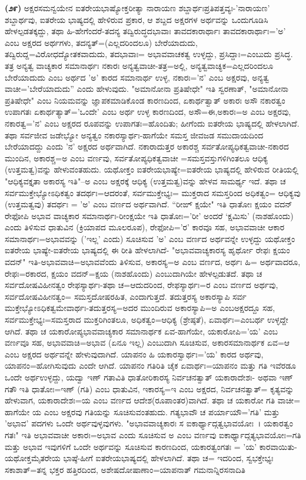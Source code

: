 \textbf{(೨೯)} ಅಕ್ಷರಸಮನ್ವಯೇನ ಐತರೇಯಭಾಷ್ಯೋಕ್ತರೀತ್ಯಾ ನಾರಾಯಣ ಶಬ್ದಾರ್ಥಃ\break ಪ್ರತಿಪತ್ತವ್ಯಃ-'ನಾರಾಯಣ' ಶಬ್ದಾರ್ಥವು, ಐತರೇಯ ಭಾಷ್ಯದಲ್ಲಿ ಹೇಳಿರುವ ಪ್ರಕಾರ, ಆ ಶಬ್ದದ ಅಕ್ಷರಗಳ ಅರ್ಥವನ್ನು ಒಂದುಗೂಡಿಸಿ ಹೇಳಲ್ಪಡತಕ್ಕದ್ದು, ತಥಾ ಹಿ-ಹೇಗೆಂದರೆ-\-ತದನ್ಯ ತದ್ವಿರುದ್ಧದಭಾವಾಃ ತಾವದಕಾರಾರ್ಥಾಃ ತಾವದಕಾರಾರ್ಥಾಃ='ಅ' ಎಂಬ ಅಕ್ಷರದ ಅರ್ಥಗಳು, ತದನ್ಯತ್=(ಎಲ್ಲದರಿಂದಲೂ) ಬೇರೆಯಾದುದು, ತದ್ವಿರುದ್ದ=ವಿರೋಧ\-ದ್ಯೋತಕ\-ವಾದುದು, ತದಭಾವಾಃ= ಅಭಾವವಾಚಕತ್ವ ಉಳ್ಳದ್ದು, ಪ್ರಸಿದ್ದಾಃ=ಎಂಬುದು ಪ್ರಸಿದ್ಧ. ತತ್ರ ಅನ್ಯತ್ವ ವಾಚ್ಯಕಾರ ಸಮಾನಾರ್ಥಃ ನಕಾರಃ ಅನ್ಯತ್ವವಾಚೀ-ತತ್ರ=ಅಲ್ಲಿ, ಅನ್ಯತ್ವ\-ವಾಚ್ಯಕ=\break ಎಲ್ಲದರಿಂದಲೂ ಬೇರೆಯಾದುದು ಎಂಬ ಅರ್ಥದ 'ಅ' ಕಾರದ ಸಮಾನಾರ್ಥ ಉಳ್ಳ, ನಕಾರಃ='ನ' ಎಂಬ ಅಕ್ಷರವು, ಅನ್ಯತ್ವ ವಾಚೀ='ಬೇರೆಯಾದುದು'' ಎಂದು ಹೇಳುವುದು. "ಅಮಾನೋನಾ ಪ್ರತಿಷೇಧೇ" ಇತಿ ಸ್ವರಣಾತ್, "ಅಮಾನೋನಾ ಪ್ರತಿಷೇಧೇ" ಎಂಬ ನಿಯಮವನ್ನು ಜ್ಞಾಪಕಮಾಡಿಕೊಂಡ ಕಾರಣದಿಂದ, ಏಕಾರ್ಥತ್ವಾತ್ ಅಕಾರಃ ಅಸೌ ನಕಾರತ್ವಂ ಉಪಾಗತಃ ಏಕಾರ್ಥತ್ಯಾತ್='ಒಂದೇ' ಎಂಬ ಅರ್ಥ ಉಳ್ಳ ಕಾರಣದಿಂದ, ಅಸೌ=ಈ,\break ಅಕಾರಃ=ಅ ಎಂಬ ಅಕ್ಷರವು, ನಕಾರತ್ವ='ನ' ಎಂಬ ಅಕ್ಷರದ ರೂಪವನ್ನು ಉಪಾಗತಃ=\break ಹೊಂದಿತು; ಹೀಗೆಂದು ಐತರೇಯ ಭಾಷ್ಯದಲ್ಲಿ ಹೇಳಲಾಗಿದೆ. ತಥಾ ಸರ್ವಜೀವ ಜಡೇಭ್ಯೋ ಅನ್ಯತ್ವಂ ನಕಾರಸ್ಯಾರ್ಥಃ-ಹಾಗೆಯೇ ಸಮಸ್ತ ಜೀವಜಡ ಸಮುದಾಯದಿಂದ ಬೇರೆಯಾದದ್ದು ಎಂದು 'ನ' ಅಕ್ಷರದ ಅರ್ಥವಾಗಿದೆ. ನಕಾರಾದುತ್ತರ ಅಕಾರಶ್ಚ ಸರ್ವತೋಪ್ಯಧಿಕತ್ವವಾಚೀ-ನಕಾರದ ಮುಂದಿನ, ಅಕಾರಶ್ಚ=ಅ ಎಂಬ ವರ್ಣವು, ಸರ್ವತೋಪ್ಯಧಿಕತ್ವವಾಚೀ =ಸಮಸ್ತವಸ್ತುಗಳಿಗಿಂತಲೂ ಆಧಿಕ್ಯ (ಉತ್ತಮತ್ವ)ವನ್ನು ಹೇಳುವಂತಹುದು. ಯಥೋಕ್ತಂ ಐತರೇಯಭಾಷ್ಯೇ=ಐತರೇಯ ಭಾಷ್ಯದಲ್ಲಿ ಹೇಳಿರುವ ರೀತಿಯಲ್ಲಿ "ಆಧಿಕ್ಯವಕ್ತೃತಾ ಅಕಾರಸ್ಯ ಇತಿ"–ಅ ಎಂಬ ಅಕ್ಷರಕ್ಕೆ ಆಧಿಕ್ಯ (ಉತ್ತಮತ್ವ)ವನ್ನು ಹೇಳವ ಸಾಮರ್ಥ್ಯ ಇದೆ. ತಥಾ ಚ ಸರ್ವಮುಕ್ತೇಭ್ಯೋಽಧಿಕತ್ವಂ ತದರ್ಥಃ=ಆದರಂತೆ, ಸರ್ವಮುಕ್ತೇಭ್ಯಃ= ಮುಕ್ತರಾದ ಸಮಸ್ತರಿಂದ ಅಧಿಕತ್ವಂ= ಆಧಿಕ್ಯವು (ಉತ್ತಮತ್ವವು) ತದರ್ಥಃ = 'ಅ' ಎಂಬ ವರ್ಣದ ಅರ್ಥವಾಗಿದೆ. “ರೀಙ್ ಕ್ಷಯೇ" ಇತಿ ಧಾತೋಃ ಕ್ಷಯಂ ವದನ್ ರೇಫೋಪಿ ಅಭಾವ ವಾಚ್ಯಕಾರ ಸಮಾನಾರ್ಥಃ-ರೀಂಕ್ಷಯೇ ಇತಿ ಧಾತೋಃ='ರೀ' ಅಂದರೆ `ಕ್ಷಮಿಸು' (ನಾಶಹೊಂದು) ಎಂದು ತಿಳಿಸುವ ಧಾತುವಿನ (ಕ್ರಿಯಾಪದ ಮೂಲರೂಪ), ರೇಫೋಪಿ='ರ' ಕಾರವೂ ಸಹ, ಅಭಾವವಾಚೀ ಆಕಾರ ಸಮಾನಾರ್ಥಃ=ಅಭಾವವನ್ನು ('ಇಲ್ಲ' ಎಂದು) ಸೂಚಿಸುವ 'ಅ' ಎಂಬ ವರ್ಣದ ಅರ್ಥವನ್ನೇ ಉಳ್ಳದ್ದು ಯಥೋಕ್ತಂ ಐತರೇಯ ಭಾಷ್ಯೇ-ಐತರೇಯ ಭಾಷ್ಯದಲ್ಲಿ ಈ ರೀತಿ ಹೇಳಲಾಗಿದೆ- "ಅಭಾವವಾಚ್ಯಕಾರಸ್ಯ ಹೃರ್ಥೋ ರೇಫಃ ಕ್ಷಯಂ ವದನ್" ಇತಿ-ಅಭಾವವಾಚಿ=ಅಭಾವವೆಂದು ತಿಳಿಸುವ, ಅಕಾರಸ್ಯ=ಅ ಎಂಬ ವರ್ಣದ, ಅರ್ಥಃ ಹಿ= ಅರ್ಥವಾದರೂ, ರೇಫಃ=ರಕಾರದ, ಕ್ಷಯಂ ವದನ್=ಕ್ಷಯ (ನಾಶಹೊಂದು) ಎಂಬುದಾಗಿಯೇ ಹೇಳಲ್ಪಡುತದೆ. ತಥಾ ಚ ಸರ್ವದೋಷವಿಹೀನತ್ವಂ ರೇಫಸ್ಯಾರ್ಥಃ-ತಥಾ ಚ=ಆದುದರಿಂದ, ರೇಫಸ್ಯಾರ್ಥಃ=ರ ಎಂಬ ವರ್ಣದ ಅರ್ಥವು, ಸರ್ವದೋಷವಿಹೀನತ್ವಂ= ಸಮಸ್ತದೋಷರಹಿತ, ಎಂದಾಗುತ್ತದೆ. ತದುತ್ತರಸ್ಯ ಅಕಾರಸ್ಯಾಪಿ ಸರ್ವ ಮುಕ್ತೇ\-ಭ್ಯೋಽಧಿಕತ್ವಮೇವಾರ್ಥಃ-ತದುತ್ತರಸ್ಯ=ಅದರ ಮುಂದಿರುವ ಅಕಾರಸ್ಯಾಪಿ=ಅ ಎಂಬ\break ಅಕ್ಷರದ್ದೂ ಸಹ, ಸರ್ವಮುಕ್ತೇಭ್ಯಃ=ಸಮಸ್ತರಾದ ಮುಕ್ತರಿಗಿಂತಲೂ, ಅಧಿಕತ್ವಂ=ಆಧಿಕ್ಯ (ಶ್ರೇಷ್ಠತೆ), ಏವಾರ್ಥಃ=ಎಂಬರ್ಥ ಉಳ್ಳದ್ದೇ ಆಗಿದೆ. ತಥಾ ಚ ಯಕಾರೋಪ್ಯಭಾವವಾಚ್ಯಕಾರ ಸಮಾನಾರ್ಥಕ ಏವ-ಹಾಗೆಯೇ, ಯಕಾರೋಪಿ='ಯ' ಎಂಬ ವರ್ಣವೂ ಸಹ, ಅಭಾವವಾಚಿ=ಅಭಾವ (ಏನೂ ಇಲ್ಲ) ಎಂಬುದಾಗಿ ಸೂಚಿಸುವ, ಅಕಾರಸಮಾನಾರ್ಥಕ ಏವ=ಆ ಎಂಬ ಅಕ್ಷರದ ಅರ್ಥವನ್ನೇ ಹೇಳುವುದಾಗಿದೆ. ಯಾಪನಂ ಹಿ ಯಕಾರಸ್ವಾರ್ಥಃ='ಯ' ಕಾರದ ಅರ್ಥವು, ಯಾಪನಂ=ಹೋಗಿಸುವುದು ಎಂದೇ ಆಗಿದೆ. ಯಾಪನಂ ಗತಿರಿತಿ ಚೈಕ ಏವಾರ್ಥಃ=ಯಾಪನಂ ಮತ್ತು ಗತಿ ಇವೆರಡೂ ಒಂದೇ ಅರ್ಥಉಳ್ಳದ್ದು, ಯದ್ವಾ ಇಣ್ ಗತಾವಿತಿ ಧಾತೋರಿಕಾರಸ್ಯ ನಿರ್ವಚನತ್ವಾತ್ ಯಕಾರಾದೇಶಃ- ಅಥವಾ ಇಣ್ ಗತೌ ಇತಿ ಧಾತೋಃ=ಇಣ್ (ಗತಿ) ಎಂಬ ಧಾತುವಿನ, ಇಕಾರಸ್ಯ=ಇ ಎಂಬ ಅಕ್ಷರದ, ನಿರ್ವಚನತ್ವಾತ್= ಕೃತ್ಯವನ್ನು ಹೇಳುವಾಗ, ಯಕಾರಾದೇಶಃ=ಯ ಎಂಬ ವರ್ಣದ ಆದೇಶ(ರೂಪಾಂತರ)ವಾಗಿದೆ. ತಥಾ ಚ ಯಕಾರೋ ಗತಿ ವಾಚೀ= ಹಾಗೆಯೇ ಯ ಎಂಬ ಅಕ್ಷರವು ಗತಿಯನ್ನು ಸೂಚಿಸುವಂತಹುದು. ಗತ್ಯಭಾವೌ ಚ ಪರ್ಯಾಯೌ\break ='ಗತಿ' ಮತ್ತು 'ಅಭಾವ' ಪದಗಳು ಒಂದೇ ಅರ್ಥವುಳ್ಳವುಗಳು. "ಅಭಾವವಾಚ್ಯಕಾರಃ ಸ ಐಕಾರ್ಥ್ಯಾದ್ಗತ್ವಭಾವಯೋಃ~। ಯಕಾರತ್ವಂ ಗತಃ" ಇತಿ ಅಭಾವವಾಚೀ ಅಕಾರಃ=ಅಭಾವ ಎಂದು ಸೂಚಿಸುವ ಅ ಎಂಬ ವರ್ಣವು ಐಕಾರ್ಥ್ಯಾದ್ಗತ್ಯಭಾವಯೋಃ=ಗತಿ ಮತ್ತು ಅಭಾವ ಇವುಗಳಿಗೆ ಒಂದೇ ಅರ್ಥವನ್ನು ಸೂಚಿಸುವ ಕಾರಣದಿಂದ, ಯಕಾರತ್ವಂಗತಃ = 'ಯ' ಕಾರ\-ವಾಯಿತು- ಯಥೋಕ್ತಮೈತರೇಯ ಭಾಷ್ಠೆ-ಹೀಗೆ ಐತರೇಯಭಾಷ್ಯದಲ್ಲಿ ಹೇಳಲಾಗಿದೆ. ತಥಾ ಚ= ಇದರಿಂದ, ಸ್ವಭಕ್ತೇಭ್ಯಃ ಸಕಾಶಾತ್=ತನ್ನ ಭಕ್ತರ ಹತ್ತಿರದಿಂದ, ಅಶೇಷದೋಷಾಣಾಂ\break =ಯಾಪನಾತ್ ಗಮನಾನ್ನಿರಸನಾದಿತಿ 